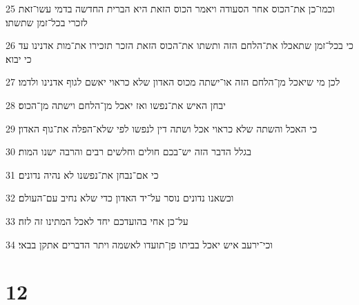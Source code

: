 \par 25 וכמו־כן את־הכוס אחר הסעודה ויאמר הכוס הזאת היא הברית החדשה בדמי עשו־זאת לזכרי בכל־זמן שתשתו׃
\par 26 כי בכל־זמן שתאכלו את־הלחם הזה ותשתו את־הכוס הזאת הזכר תזכירו את־מות אדנינו עד כי יבוא׃
\par 27 לכן מי שיאכל מן־הלחם הזה או־ישתה מכוס האדון שלא כראוי יאשם לגוף אדנינו ולדמו׃
\par 28 יבחן האיש את־נפשו ואז יאכל מן־הלחם וישתה מן־הכוס׃
\par 29 כי האכל והשתה שלא כראוי אכל ושתה דין לנפשו לפי שלא־הפלה את־גוף האדון׃
\par 30 בגלל הדבר הזה יש־בכם חולים וחלשים רבים והרבה ישנו המות׃
\par 31 כי אם־נבחן את־נפשנו לא נהיה נדונים׃
\par 32 וכשאנו נדונים נוסר על־יד האדון כדי שלא נחיב עם־העולם׃
\par 33 על־כן אחי בהועדכם יחד לאכל המתינו זה לזה׃
\par 34 וכי־ירעב איש יאכל בביתו פן־תועדו לאשמה ויתר הדברים אתקן בבאי׃

\chapter{12}

